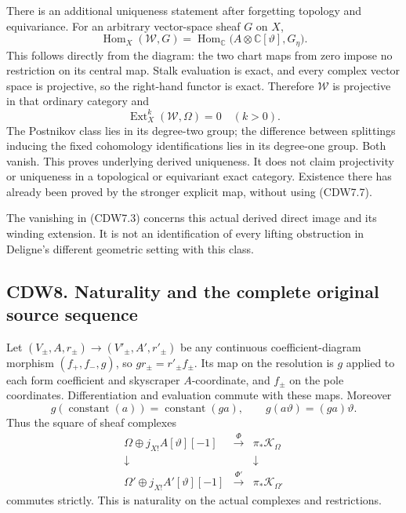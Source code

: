 There is an additional uniqueness statement after forgetting topology
and equivariance. For an arbitrary vector-space sheaf \(G\) on \(X\), \[
\operatorname{Hom}_X(\mathscr W,G)
=\operatorname{Hom}_{\mathbb C}
\bigl(A\otimes\mathbb C[\vartheta],G_\eta\bigr).
\tag{CDW7.6}
\] This follows directly from the diagram: the two chart maps from zero
impose no restriction on its central map. Stalk evaluation is exact, and
every complex vector space is projective, so the right-hand functor is
exact. Therefore \(\mathscr W\) is projective in that ordinary category
and \[
\operatorname{Ext}^k_X(\mathscr W,\Omega)=0\quad(k>0).
\tag{CDW7.7}
\] The Postnikov class lies in its degree-two group; the difference
between splittings inducing the fixed cohomology identifications lies in
its degree-one group. Both vanish. This proves underlying derived
uniqueness. It does not claim projectivity or uniqueness in a
topological or equivariant exact category. Existence there has already
been proved by the stronger explicit map, without using (CDW7.7).

The vanishing in (CDW7.3) concerns this actual derived direct image and
its winding extension. It is not an identification of every lifting
obstruction in Deligne's different geometric setting with this class.

\subsection{CDW8. Naturality and the complete original source
sequence}\label{cdw8.-naturality-and-the-complete-original-source-sequence}

Let \((V_\pm,A,r_\pm)\to(V'_\pm,A',r'_\pm)\) be any continuous
coefficient-diagram morphism \((f_+,f_-,g)\), so
\(gr_\pm=r'_\pm f_\pm\). Its map on the resolution is \(g\) applied to
each form coefficient and skyscraper \(A\)-coordinate, and \(f_\pm\) on
the pole coordinates. Differentiation and evaluation commute with these
maps. Moreover \[
g(\operatorname{constant}(a))=\operatorname{constant}(ga),
\qquad g(a\vartheta)=(ga)\vartheta.
\tag{CDW8.1}
\] Thus the square of sheaf complexes \[
\begin{array}{ccc}
\Omega\oplus j_{X!}A[\vartheta][-1]&\xrightarrow{\Phi}&\pi_*\mathscr K_\Omega\\
\downarrow&&\downarrow\\
\Omega'\oplus j_{X!}A'[\vartheta][-1]&\xrightarrow{\Phi'}&\pi_*\mathscr K_{\Omega'}
\end{array}
\tag{CDW8.2}
\] commutes strictly. This is naturality on the actual complexes and
restrictions.

